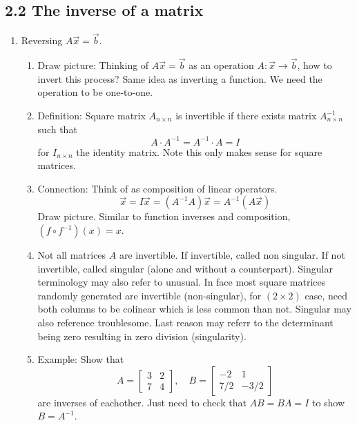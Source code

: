 \documentclass{article}
\begin{document}
\subsection{2.2 The inverse of a matrix}

\begin{enumerate}

\item Reversing $A\vec{x} = \vec{b}$. 
\begin{enumerate}

\item Draw picture: Thinking of $A\vec{x} = \vec{b}$ as an operation $A: \vec{x} \rightarrow \vec{b}$, how to invert this process? Same idea as inverting a function. We need the operation to be one-to-one.

\item Definition: Square matrix $A_{n \times n}$ is invertible if there exists matrix $A^{-1}_{n \times n}$ such that
\[
A \cdot A^{-1} = A^{-1} \cdot A = I
\]
for $I_{n\times n}$ the identity matrix. Note this only makes sense for square matrices.

\item Connection: Think of as composition of linear operators.
\[
\vec{x} = I\vec{x} = (A^{-1}A)\vec{x} = A^{-1}(A\vec{x})
\]
Draw picture. Similar to function inverses and composition, $(f \circ f^{-1})(x) = x$. 

\item Not all matrices $A$ are invertible. If invertible, called non singular. If not invertible, called singular (alone and without a counterpart). Singular terminology may also refer to unusual. In face most square matrices randomly generated are invertible (non-singular), for $(2\times 2)$ case, need both columns to be colinear which is less common than not. Singular may also reference troublesome. Last reason may referr to the determinant being zero resulting in zero division (singularity).

\item Example: Show that
\[
A = \left[
\begin{array}{cc}
3 & 2 \\
7 & 4
\end{array}
\right], \quad 
B = \left[
\begin{array}{cc}
-2 & 1 \\
7/2 & -3/2
\end{array}
\right]
\]
are inverses of eachother. Just need to check that $AB=BA=I$ to show $B=A^{-1}$. 


\end{enumerate}
\end{enumerate}
\end{document}
